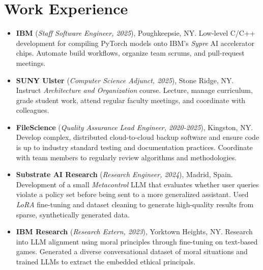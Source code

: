 \documentclass[11pt]{article}
\begin{document}
\section*{Work Experience}
\begin{itemize}
    \itemsep0em
    
    \item \textbf{IBM} (\textit{Staff Software Engineer, 2025}), Poughkeepsie, NY. Low-level C/C++ development for compiling PyTorch models onto IBM's \textit{Sypre} AI accelerator chips.  Automate build workflows, organize team scrums, and pull-request meetings.
    
    \item \textbf{SUNY Ulster} (\textit{Computer Science Adjunct, 2025}), Stone Ridge, NY. Instruct \textit{Architecture and Organization} course.  Lecture, manage curriculum, grade student work, attend regular faculty meetings, and coordinate with colleagues.
    
    \item \textbf{FileScience} (\textit{Quality Assurance Lead Engineer, 2020-2025}), Kingston, NY. Develop complex, distributed cloud-to-cloud backup software and ensure code is up to industry standard testing and documentation practices.  Coordinate with team members to regularly review algorithms and methodologies.
    
    \item \textbf{Substrate AI Research} (\textit{Research Engineer, 2024}), Madrid, Spain. Development of a small \textit{Metacontrol} LLM that evaluates whether user queries violate a policy set before being sent to a more generalized assistant.  Used \textit{LoRA} fine-tuning and dataset cleaning to generate high-quality results from sparse, synthetically generated data.

    \item \textbf{IBM Research} (\textit{Research Extern, 2023}), Yorktown Heights, NY. Research into LLM alignment using moral principles through fine-tuning on text-based games. Generated a diverse conversational dataset of moral situations and trained LLMs to extract the embedded ethical principals.

\end{itemize}
\end{document}
